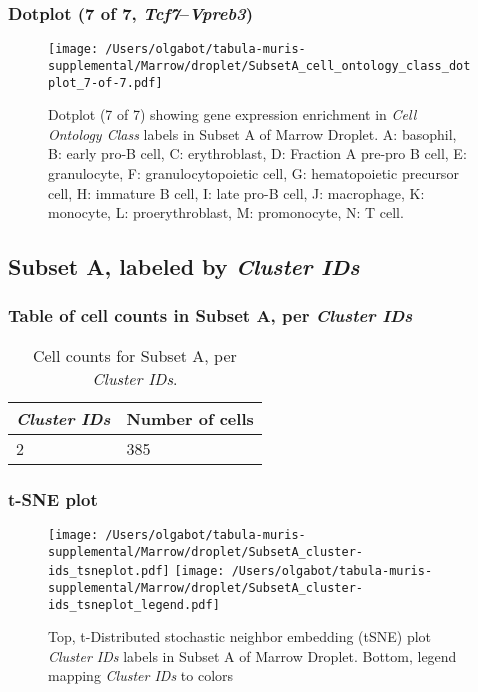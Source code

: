 \clearpage

\subsubsection{Dotplot (7 of 7, \emph{Tcf7}--\emph{Vpreb3})}
\begin{figure}[h]
\centering
\texttt{[image: /Users/olgabot/tabula-muris-supplemental/Marrow/droplet/SubsetA\_cell\_ontology\_class\_dotplot\_7-of-7.pdf]}

\caption{ Dotplot (7 of 7)  showing gene expression enrichment in \emph{Cell Ontology Class} labels in Subset A of Marrow Droplet. A: basophil, B: early pro-B cell, C: erythroblast, D: Fraction A pre-pro B cell, E: granulocyte, F: granulocytopoietic cell, G: hematopoietic precursor cell, H: immature B cell, I: late pro-B cell, J: macrophage, K: monocyte, L: proerythroblast, M: promonocyte, N: T cell.}
\end{figure}


\clearpage

\subsection{Subset A, labeled by \emph{Cluster IDs}}
\subsubsection{Table of cell counts in Subset A, per \emph{Cluster IDs}}\begin{table}[h]
\centering
\label{my-label}
\begin{tabular}{@{}ll@{}}
\toprule

\emph{Cluster IDs}& Number of cells \\ \midrule
2 & 385 \\
\bottomrule
\end{tabular}
\caption{Cell counts for Subset A, per \emph{Cluster IDs}.}
\end{table}

\clearpage
\subsubsection{t-SNE plot}
\begin{figure}[h]
\centering
\texttt{[image: /Users/olgabot/tabula-muris-supplemental/Marrow/droplet/SubsetA\_cluster-ids\_tsneplot.pdf]}
\texttt{[image: /Users/olgabot/tabula-muris-supplemental/Marrow/droplet/SubsetA\_cluster-ids\_tsneplot\_legend.pdf]}
\caption{Top, t-Distributed stochastic neighbor embedding (tSNE) plot  \emph{Cluster IDs} labels in Subset A of Marrow Droplet. Bottom, legend mapping \emph{Cluster IDs} to colors}
\end{figure}


